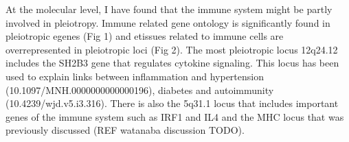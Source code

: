 At the molecular level, I have found that the immune system might be partly involved in pleiotropy.
%
Immune related gene ontology is significantly found in pleiotropic egenes (Fig 1) and etissues related to immune cells are overrepresented in pleiotropic loci (Fig 2).
%
The most pleiotropic locus 12q24.12 includes the SH2B3 gene that regulates cytokine signaling.
%
This locus has been used to explain links between inflammation and hypertension (10.1097/MNH.0000000000000196), diabetes and autoimmunity (10.4239/wjd.v5.i3.316).
%
There is also the 5q31.1 locus that includes important genes of the immune system such as IRF1 and IL4 and the MHC locus that was previously discussed (REF watanaba discussion TODO).



%
%
%
%

